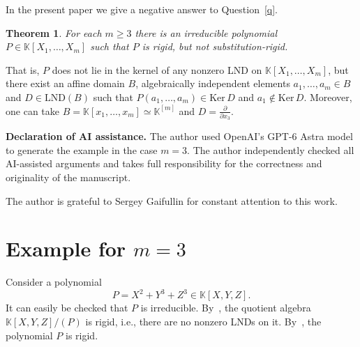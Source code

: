 \documentclass[12pt,reqno]{amsart}
\newcommand{\KK}{\mathbb K}
\newcommand{\Ker}{\mathrm{Ker}\,}
\newcommand{\LND}{\mathrm{LND}}
\theoremstyle{plain}
\newtheorem{theorem}{Theorem}
\theoremstyle{remark}
\theoremstyle{definition}
\begin{document}
In the present paper we give a negative answer to Question~\ref{q}.

\begin{theorem}\label{thm}
    For each $m\geq 3$ there is an irreducible polynomial $P\in\KK[X_1,\dots,X_m]$ such that $P$ is rigid, but not substitution-rigid.
\end{theorem}

 That is, $P$ does not lie in the kernel of any nonzero LND on $\KK[X_1,\dots,X_m]$, but there exist an affine domain $B$, algebraically independent elements $a_1,\dots,a_m\in B$ and ${D\in\LND(B)}$ such that $P(a_1, \dots,a_m)\in\Ker D$ and $a_1\not\in\Ker D$. Moreover, one can take $B=\KK[x_1,\dots,x_m]\simeq \KK^{[m]}$ and $D=\frac{\partial}{\partial x_3}$.

\textbf{Declaration of AI assistance.} The author used OpenAI’s GPT-6 Astra model to generate the example in the case $m=3$. The author independently checked all AI-assisted arguments and takes full responsibility for the correctness and originality of the manuscript.

The author is grateful to Sergey Gaifullin for constant
attention to this work.

\section{Example for $m=3$}
\label{sectm=3}
Consider a polynomial
\begin{equation}
\label{eqm=3}
    P=X^2+Y^3+Z^3\in\KK[X,Y,Z].
\end{equation}
It can easily be checked that $P$ is irreducible. By~\cite[Theorem 9.7(a)]{F}, the quotient algebra $\KK[X,Y,Z]/(P)$ is rigid, i.e., there are no nonzero LNDs on it. By~\cite[Remark 2]{K26}, the polynomial $P$ is rigid.
\end{document}
